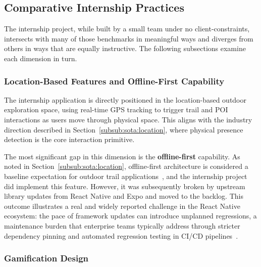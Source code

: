 \vspace*{0.5cm}
\subsection{Comparative Internship Practices}\label{sub:contrast}
 
The internship project, while built by a small team under no
client-constraints, intersects with many of those benchmarks in
meaningful ways and diverges from others in ways that are equally
instructive.
The following subsections examine each dimension in turn.

 
\subsubsection{Location-Based Features and Offline-First
Capability}\label{subsub:contrast:location}
 
The internship application is directly positioned in the
location-based outdoor exploration space, using real-time GPS
tracking to trigger trail and POI interactions as users move
through physical space. This aligns with the industry direction
described in Section~\ref{subsub:sota:location}, where physical
presence detection is the core interaction primitive.
 
The most significant gap in this dimension is the \textbf{offline-first}
capability.
As noted in Section~\ref{subsub:sota:location}, offline-first
architecture is considered a baseline expectation for outdoor
trail applications~\cite{markwide2026hiking}, and the
internship project did implement this feature.
However, it was subsequently broken by upstream library updates
from React Native and Expo and moved to the backlog.
This outcome illustrates a real and widely reported challenge in
the React Native ecosystem: the pace of framework updates can
introduce unplanned regressions, a maintenance burden that
enterprise teams typically address through stricter dependency
pinning and automated regression testing in CI/CD
pipelines~\cite{markwide2026hiking}.
 
 
\subsubsection{Gamification Design}\label{subsub:contrast:gamification}
 
